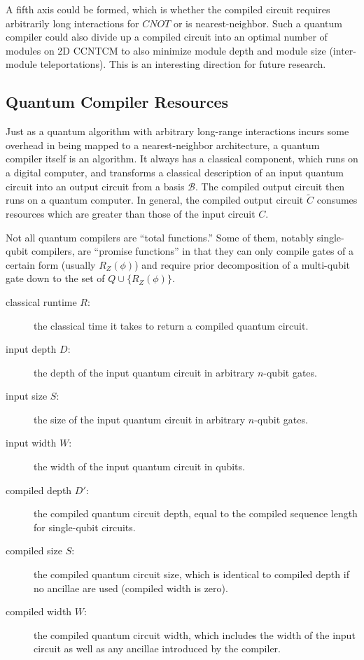 A fifth axis could be formed, which is whether the compiled circuit requires
arbitrarily long interactions for $CNOT$ or is nearest-neighbor. Such a
quantum compiler could also divide up a compiled circuit into an optimal
number of modules on \textsf{2D CCNTCM} to also minimize module depth and
module size (inter-module teleportations). This is an interesting direction
for future research.

\subsection{Quantum Compiler Resources}

Just as a quantum algorithm with arbitrary long-range interactions incurs
some overhead in being mapped to a nearest-neighbor architecture,
a quantum compiler itself is an algorithm. It always has a classical
component, which runs on a digital computer, and transforms a classical
description of an input quantum circuit into an output circuit from
a basis $\mathcal{B}$. The compiled output circuit then runs on a
quantum computer. In general, the compiled output circuit $\tilde{C}$ consumes
resources which are greater than those of the input circuit $C$.

Not all quantum compilers are ``total functions.'' Some of them, notably
single-qubit compilers, are ``promise functions'' in that they can
only compile gates of a certain form (usually $R_Z(\phi)$) and require
prior decomposition of a multi-qubit gate down to the set of
$Q \cup \{R_Z(\phi)\}$.

\begin{description}
\item[classical runtime $R$:] the classical time it takes to return a 
compiled quantum circuit.
\item[input depth $D$:] the depth of the input quantum circuit in arbitrary
$n$-qubit gates.
\item[input size $S$:] the size of the input quantum circuit in arbitrary
$n$-qubit gates.
\item[input width $W$:] the width of the input quantum circuit in qubits.
\item[compiled depth $D'$:] the compiled quantum circuit depth, equal to
the compiled sequence length for single-qubit circuits.
\item[compiled size $S$:] the compiled quantum circuit size, which is
identical to compiled depth if no ancillae are used (compiled width is zero).
\item[compiled width $W$:] the compiled quantum circuit width, which includes
the width of the input circuit as well as any ancillae introduced by
the compiler.
\end{description}

